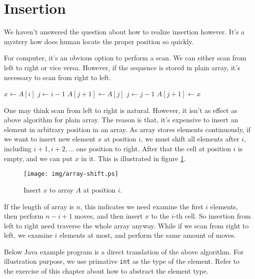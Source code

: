 \documentclass{article}
\begin{document}
\section{Insertion}

We haven't answered the question about how to realize insertion however.
It's a mystery how does human locate the proper position so quickly.

For computer, it's an obvious option to perform a scan. We can either
scan from left to right or vice versa. However, if the sequence is
stored in plain array, it's necessary to scan from right to left.

\begin{algorithmic}
    \State $x \gets A[i]$
    \State $j \gets i-1$
      \State $A[j+1] \gets A[j]$
      \State $j \gets j - 1$
    \EndWhile
    \State $A[j+1] \gets x$
  \EndFor
\EndFunction
\end{algorithmic}

One may think scan from left to right is natural. However, it isn't
as effect as above algorithm for plain array. The reason is that, it's
expensive to insert an element in arbitrary position in an array.
As array stores elements continuously, if we want to insert new element
$x$ at position $i$, we must shift all elements after $i$, including
$i+1, i+2, ...$ one position to right. After that the cell at position $i$
is empty, and we can put $x$ in it. This is illustrated in
figure \ref{fig:array-shift}.

\begin{figure}[htbp]
  \centering
  \texttt{[image: img/array-shift.ps]}
  \caption{Insert $x$ to array $A$ at position $i$.}
  \label{fig:array-shift}
\end{figure}

If the length of array is $n$, this indicates we need examine the
first $i$ elements, then perform
$n-i+1$ moves, and then insert $x$ to the $i$-th cell. So insertion
from left to right need traverse the whole array anyway.
While if we scan from right to
left, we examine $i$ elements at most, and perform the same
amount of moves.

Below Java example program is a direct translation of the above algorithm. For illustration purpose, we use primative \texttt{int} as the type of the element. Refer to the exercise of this chapter about how to abstract the element type.
\end{document}
